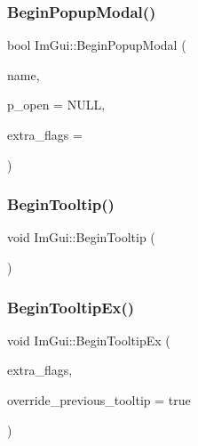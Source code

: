 \hypertarget{namespace_im_gui_aa70aaf1dacf5702f85feca6f729a307a}{}\label{namespace_im_gui_aa70aaf1dacf5702f85feca6f729a307a} 
\subsubsection{\texorpdfstring{Begin\+Popup\+Modal()}{BeginPopupModal()}}
{\footnotesize\ttfamily bool Im\+Gui\+::\+Begin\+Popup\+Modal (\begin{DoxyParamCaption}\item[{const char $\ast$}]{name,  }\item[{bool $\ast$}]{p\+\_\+open = {\ttfamily NULL},  }\item[{Im\+Gui\+Window\+Flags}]{extra\+\_\+flags = {} }\end{DoxyParamCaption})}

\hypertarget{namespace_im_gui_a36816a48385f4759d746a03cf6202512}{}\label{namespace_im_gui_a36816a48385f4759d746a03cf6202512} 
\subsubsection{\texorpdfstring{Begin\+Tooltip()}{BeginTooltip()}}
{\footnotesize\ttfamily void Im\+Gui\+::\+Begin\+Tooltip (\begin{DoxyParamCaption}{ }\end{DoxyParamCaption})}

\hypertarget{namespace_im_gui_a3189530b7795a9b99169eb95f36c516d}{}\label{namespace_im_gui_a3189530b7795a9b99169eb95f36c516d} 
\subsubsection{\texorpdfstring{Begin\+Tooltip\+Ex()}{BeginTooltipEx()}}
{\footnotesize\ttfamily void Im\+Gui\+::\+Begin\+Tooltip\+Ex (\begin{DoxyParamCaption}\item[{Im\+Gui\+Window\+Flags}]{extra\+\_\+flags,  }\item[{bool}]{override\+\_\+previous\+\_\+tooltip = {\ttfamily true} }\end{DoxyParamCaption})}


